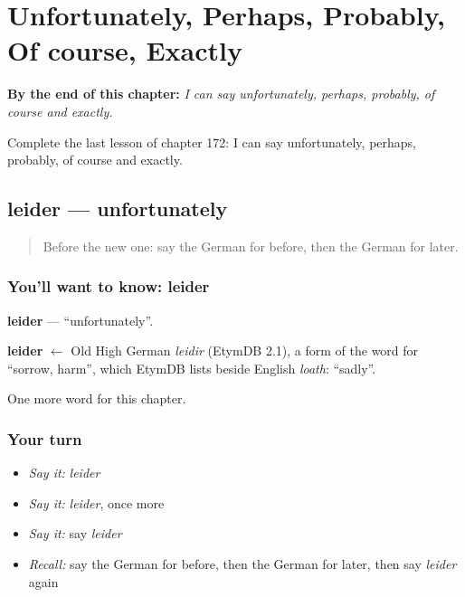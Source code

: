 
\chapter{Unfortunately, Perhaps, Probably, Of course, Exactly}
\label{ch:ge-unfortunately-perhaps-probably-of-course-exactly}

\begin{chapteropening}
\textbf{By the end of this chapter:} \emph{I can say unfortunately, perhaps, probably, of course and exactly.}

Complete the last lesson of chapter 172: I can say unfortunately, perhaps, probably, of course and exactly.
\end{chapteropening}

\section[leider]{leider — unfortunately}

\label{lesson:GE-C172-leider}



\begin{quote}
Before the new one: say the German for before, then the German for later.
\end{quote}

\subsection*{You'll want to know: leider}
\textbf{leider} — \textquotedblleft{}unfortunately\textquotedblright{}.

\begin{cousinweb}
\textbf{leider} $\leftarrow$ Old High German \emph{leidir} (EtymDB 2.1), a form of the word for \textquotedblleft{}sorrow, harm\textquotedblright{}, which EtymDB lists beside English \emph{loath}: \textquotedblleft{}sadly\textquotedblright{}.
\end{cousinweb}

\begin{grammarlens}[title={What you've built}]
One more word for this chapter.
\end{grammarlens}

\subsection*{Your turn}
\begin{itemize}
\raggedright
  \item \emph{Say it:} \emph{leider}
  \item \emph{Say it:} \emph{leider}, once more
  \item \emph{Say it:} say \emph{leider}
  \item \emph{Recall:} say the German for before, then the German for later, then say \emph{leider} again
\end{itemize}

